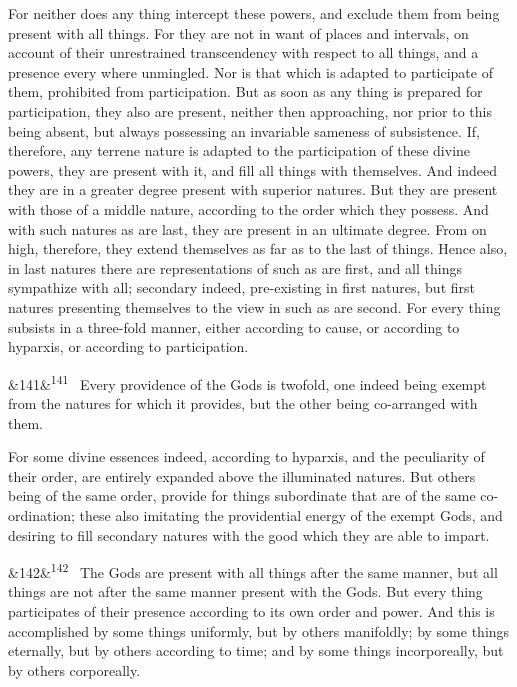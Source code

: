 \documentclass[12pt]{article}
\newcommand{\para}[1][]{\par\noindent\ifx&#1&\else\textsuperscript{\footnotesize #1}~\fi}
\begin{document}
For neither does any thing intercept these powers, and exclude them from being present with all things. For they are not in want of places and intervals, on account of their unrestrained transcendency with respect to all things, and a presence every where unmingled. Nor is that which is adapted to participate of them, prohibited from participation. But as soon as any thing is prepared for participation, they also are present, neither then approaching, nor prior to this being absent, but always possessing an invariable sameness of subsistence. If, therefore, any terrene nature is adapted to the participation of these divine powers, they are present with it, and fill all things with themselves. And indeed they are in a greater degree present with superior natures. But they are present with those of a middle nature, according to the order which they possess. And with such natures as are last, they are present in an ultimate degree. From on high, therefore, they extend themselves as far as to the last of things. Hence also, in last natures there are representations of such as are first, and all things sympathize with all; secondary indeed, pre-existing in first natures, but first natures presenting themselves to the view in such as are second. For every thing subsists in a three-fold manner, either according to cause, or according to hyparxis, or according to participation.

\para[141] Every providence of the Gods is twofold, one indeed being exempt from the natures for which it provides, but the other being co-arranged with them.

For some divine essences indeed, according to hyparxis, and the peculiarity of their order, are entirely expanded above the illuminated natures. But others being of the same order, provide for things subordinate that are of the same co-ordination; these also imitating the providential energy of the exempt Gods, and desiring to fill secondary natures with the good which they are able to impart.

\para[142] The Gods are present with all things after the same manner, but all things are not after the same manner present with the Gods. But every thing participates of their presence according to its own order and power. And this is accomplished by some things uniformly, but by others manifoldly; by some things eternally, but by others according to time; and by some things incorporeally, but by others corporeally.
\end{document}
